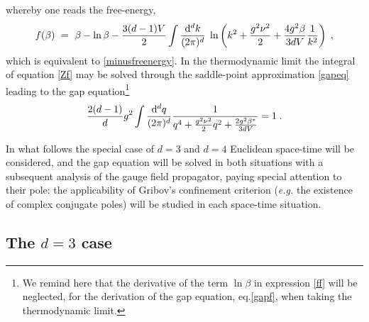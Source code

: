 whereby one reads the free-energy,
\begin{equation}
f(\beta)  ~=~  \beta - \ln \beta - \frac{3(d-1)V}{2} \int \frac{\mathrm{d}^d k}{(2\pi)^d} \; \ln\left( k^2 + \frac{g^2\nu^2}{2} +  \frac{4g^2\beta}{3dV} \frac{1}{k^2} \right)  \;, \label{ff}
\end{equation}
which is equivalent to \eqref{minusfreenergy}. In the thermodynamic limit the integral of equation \eqref{Zf} may be solved through the saddle-point approximation \eqref{gapeq} leading to the gap equation\footnote{We remind here that the derivative of the term ${\ln\beta}$  in expression \eqref{ff} will be neglected, for the derivation of the gap equation, eq.\eqref{gapf}, when taking the thermodynamic limit.}
\begin{equation}
\frac{2(d-1)}{d}g^2 \int \frac{\mathrm{d}^d q}{(2\pi)^d} \frac{1}{ q^{4} + \frac{g^{2}\nu^{2}}{2} q^2  +   \frac{2g^2\beta^{\ast}}{3dV} }  = 1  \;.
\label{gapf}
\end{equation}

In what follows the special case of $d=3$ and $d=4$ Euclidean space-time will be considered,
and the gap equation will be solved in both situations with a subsequent analysis of the gauge
field propagator, paying special attention to their pole: the applicability of Gribov's
confinement criterion (\emph{e.g.} the existence of complex conjugate poles) will be studied in
each space-time situation.







\subsection{The $d=3$ case}


